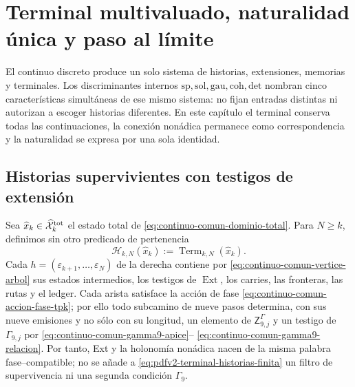 \chapter[Terminal, naturalidad y l\'imite]{Terminal multivaluado, naturalidad \'unica y paso al l\'imite}
\label{chap:pdfv2-terminal-naturalidad-limite}

\begin{thesisbox}
El continuo discreto produce un solo sistema de historias, extensiones,
memorias y terminales. Los discriminantes internos
\(\mathrm{sp},\mathrm{sol},\mathrm{gau},\mathrm{coh},\mathrm{det}\)
nombran cinco caracter\'isticas simult\'aneas de ese mismo sistema: no fijan
entradas distintas ni autorizan a escoger historias diferentes. En este
cap\'itulo el terminal conserva todas las continuaciones, la conexi\'on
non\'adica permanece como correspondencia y la naturalidad se expresa por una
sola identidad.
\end{thesisbox}

\section{Historias supervivientes con testigos de extensi\'on}

Sea
\(\widehat x_k\in\widehat{\mathcal X}^{\rm tot}_k\) el estado total de
\eqref{eq:continuo-comun-dominio-total}. Para \(N\geq k\), definimos sin
otro predicado de pertenencia
\begin{equation}
\label{eq:pdfv2-terminal-historias-finita}
 \mathscr H_{k,N}(\widehat x_k)
 :=\operatorname{Term}_{k,N}(\widehat x_k).
\end{equation}
Cada
\(h=(\varepsilon_{k+1},\ldots,\varepsilon_N)\) de la derecha contiene por
\eqref{eq:continuo-comun-vertice-arbol} sus estados intermedios, los testigos
de \(\operatorname{Ext}\), los carries, las fronteras, las rutas y el ledger.
Cada arista satisface la acción de fase
\eqref{eq:continuo-comun-accion-fase-tpk}; por ello todo subcamino de nueve
pasos determina, con sus nueve emisiones y no sólo con su longitud, un
elemento de \(\mathsf Z^\Gamma_{9,j}\) y un testigo de
\(\Gamma_{9,j}\) por
\eqref{eq:continuo-comun-gamma9-apice}--
\eqref{eq:continuo-comun-gamma9-relacion}. Por tanto, Ext y la holonomía
non\'adica nacen de la misma palabra fase--compatible; no se añade a
\eqref{eq:pdfv2-terminal-historias-finita} un filtro de supervivencia ni una
segunda condici\'on \(\Gamma_9\).

